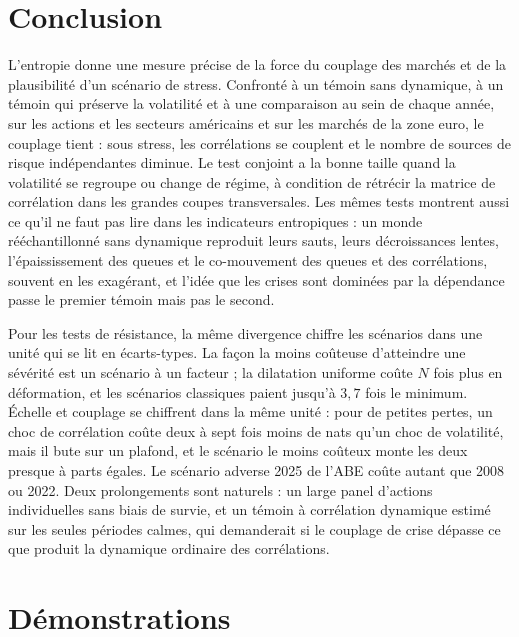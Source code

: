 \documentclass[12pt]{article}
\theoremstyle{definition}
\begin{document}
\begin{doublespace}
\section{Conclusion}
\label{sec:conclusion}

L'entropie donne une mesure précise de la force du couplage des marchés et
de la plausibilité d'un scénario de stress. Confronté à un témoin sans
dynamique, à un témoin qui préserve la volatilité et à une comparaison au sein
de chaque année, sur les actions et les secteurs américains et sur les marchés
de la zone euro, le couplage tient : sous stress, les corrélations se couplent
et le nombre de sources de risque indépendantes diminue. Le test conjoint a la
bonne taille quand la volatilité se regroupe ou change de régime, à condition
de rétrécir la matrice de corrélation dans les grandes coupes transversales.
Les mêmes tests montrent aussi ce qu'il ne faut pas lire dans les indicateurs
entropiques : un monde rééchantillonné sans dynamique reproduit leurs sauts,
leurs décroissances lentes, l'épaississement des queues et le co-mouvement des
queues et des corrélations, souvent en les exagérant, et l'idée que les crises
sont dominées par la dépendance passe le premier témoin mais pas le second.

Pour les tests de résistance, la même divergence chiffre les scénarios dans
une unité qui se lit en écarts-types. La façon la moins coûteuse d'atteindre
une sévérité est un scénario à un facteur ; la dilatation uniforme coûte $N$
fois plus en déformation, et les scénarios classiques paient jusqu'à $3{,}7$
fois le minimum. Échelle et couplage se chiffrent dans la même unité : pour de
petites pertes, un choc de corrélation coûte deux à sept fois moins de nats
qu'un choc de volatilité, mais il bute sur un plafond, et le scénario le moins
coûteux monte les deux presque à parts égales. Le scénario adverse 2025 de l'ABE coûte autant que 2008 ou
2022. Deux prolongements sont naturels : un large panel d'actions
individuelles sans biais de survie, et un témoin à corrélation dynamique estimé sur les
seules périodes calmes, qui demanderait si le couplage de crise dépasse ce que
produit la dynamique ordinaire des corrélations.

\appendix
\section{Démonstrations}
\label{app:proofs}


\end{doublespace}
\end{document}

